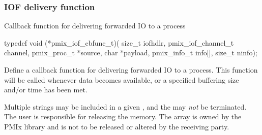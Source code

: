 \subsubsection{IOF delivery function}

\summary

Callback function for delivering forwarded \ac{IO} to a process

\format

\cspecificstart
\begin{codepar}
typedef void (*pmix_iof_cbfunc_t)(
                             size_t iofhdlr, pmix_iof_channel_t channel,
                             pmix_proc_t *source, char *payload,
                             pmix_info_t info[], size_t ninfo);
\end{codepar}
\cspecificend

\begin{arglist}
\end{arglist}

\descr

Define a callback function for delivering forwarded \ac{IO} to a process. This function will be called whenever data becomes available, or a
specified buffering size and/or time has been met.

\adviceuserstart
Multiple strings may be included in a given , and the  may \textit{not} be  terminated. The user is responsible for releasing the  memory. The  array is owned by the \ac{PMIx} library and is not to be released or altered by the receiving party.
\adviceuserend



\subsection{}

